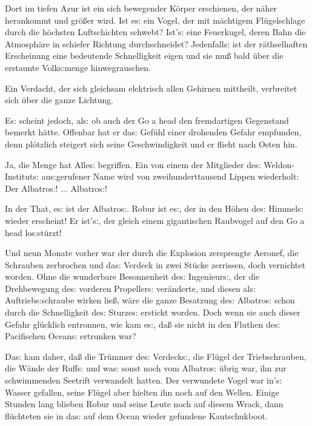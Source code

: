 \documentclass[oneside,12pt]{book}
\newenvironment{antiqua}{\normalfont}{}
\newcommand{\s}{s:}
\begin{document}
Dort im tiefen Azur ist ein sich bewegender K\"orper erschienen, der
n\"aher herankommt und gr\"o{\ss}er wird. Ist e{\s} ein Vogel, der
mit m\"achtigem Fl\"ugelschlage durch die h\"ochsten Luftschichten
schwebt? Ist'{\s} eine Feuerkugel, deren Bahn die Atmosph\"are in
schiefer Richtung durchschneidet? Jedenfall{\s} ist der r\"athselhaften
Erscheinung eine bedeutende Schnelligkeit eigen und sie mu{\ss} bald
\"uber die erstaunte Volk{\s}menge hinwegrauschen.

Ein Verdacht, der sich gleichsam elektrisch allen Gehirnen mittheilt,
verbreitet sich \"uber die ganze Lichtung.

E{\s} scheint jedoch, al{\s} ob auch der \begin{antiqua}Go a
head\end{antiqua} den fremdartigen Gegenstand bemerkt h\"atte.
Offenbar hat er da{\s} Gef\"uhl einer drohenden Gefahr empfunden,
denn pl\"otzlich steigert sich seine Geschwindigkeit und er flieht
nach Osten hin.

Ja, die Menge hat Alle{\s} begriffen. Ein von einem der Mitglieder
de{\s} Weldon-Institut{\s} au{\s}\-ge\-rufener Name wird von
zweihunderttausend Lippen wiederholt: {\glqq}Der 
{\glqq}Albatro{\s}{\grqq}! ... {\glqq}Albatro{\s}{\grqq}!{\grqq}

In der That, e{\s} ist der {\glqq}Albatro{\s}{\grqq}. Robur ist
e{\s}, der in den H\"ohen de{\s} Himmel{\s} wieder erscheint! Er
ist'{\s}, der gleich einem gigantischen Raubvogel auf den
\begin{antiqua}Go a head\end{antiqua} lo{\s}st\"urzt!

Und neun Monate vorher war der durch die Explosion zersprengte
Aeronef, die Schrauben zerbrochen und da{\s} Verdeck in zwei St\"ucke
zerrissen, doch vernichtet worden. Ohne die wunderbare Besonnenheit
de{\s} Ingenieur{\s}, der die Drehbewegung de{\s} vorderen
Propeller{\s} ver\"anderte, und diesen al{\s} Auftrieb{\s}schraube
wirken lie{\ss}, w\"are die ganze Besatzung de{\s}
{\glqq}Albatro{\s}{\grqq} schon durch die Schnelligkeit de{\s}
Sturze{\s} erstickt worden. Doch wenn sie auch dieser Gefahr
gl\"ucklich entronnen, wie kam e{\s}, da{\ss} sie nicht in den
Fluthen de{\s} Pacifischen Ocean{\s} ertrunken war?

Da{\s} kam daher, da{\ss} die Tr\"ummer de{\s} Verdeck{\s}, die
Fl\"ugel der Triebschrauben, die W\"ande der Ruff{\s} und wa{\s}
sonst noch vom {\glqq}Albatro{\s}{\grqq} \"ubrig war, ihn zur
schwimmenden Seetrift verwandelt hatten. Der verwundete Vogel war
in'{\s} Wasser gefallen, seine Fl\"ugel aber hielten ihn noch auf den
Wellen. Einige Stunden lang blieben Robur und seine Leute noch auf
diesem Wrack, dann fl\"uchteten sie in da{\s} auf dem Ocean wieder
gefundene Kautschukboot.
\end{document}
